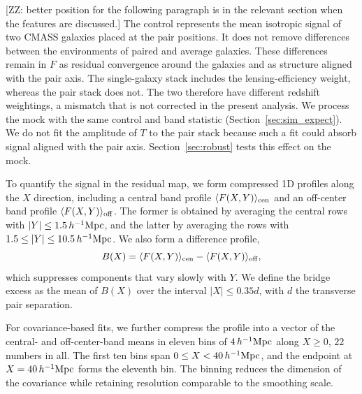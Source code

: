 \documentclass[preprint]{aastex701}
\newcommand{\hinvMpc}{h^{-1}{\rm Mpc}}
\newcommand{\ZZ}[1]{{\color{red} [ZZ: #1]}}
\begin{document}
 {
\ZZ{better position for the following paragraph is in the relevant section when the features are discussed.}
The control represents the mean isotropic signal of two CMASS galaxies placed
at the pair positions. It does not remove differences between the
environments of paired and average galaxies. These differences remain in
$F$ as residual convergence around the galaxies and as structure aligned
with the pair axis. The single-galaxy stack includes the lensing-efficiency
weight, whereas the pair stack does not. The two therefore have different
redshift weightings, a mismatch that is not corrected in the present
analysis. We process the mock with the same control and band statistic
(Section~\ref{sec:sim_expect}). We do not fit the amplitude of $T$ to the
pair stack because such a fit could absorb signal aligned with the pair axis.
Section~\ref{sec:robust} tests this effect on the mock.
}\fi


To quantify the signal in the residual map, we form compressed 1D profiles along the $X$ direction, including a central band profile $\langle F(X,Y)\rangle_{\rm cen}$ and an off-center band profile $\langle F(X,Y)\rangle_{\rm off}$. The former is obtained by averaging the central rows with $|Y|\leq1.5\,\hinvMpc$, and the latter by averaging the rows with $1.5\leq|Y|\leq10.5\,\hinvMpc$. We also form a difference profile, 
\begin{equation}
    B(X)=\langle F(X,Y)\rangle_{\rm cen} - \langle F(X,Y)\rangle_{\rm off},
    \label{eq:band}
\end{equation}
which suppresses components that vary slowly with $Y$. We define the bridge excess as the mean of $B(X)$ over the interval $|X|\leq 0.35 d$, with $d$ the transverse pair separation. 

For covariance-based fits, we further compress the profile into a vector of the
central- and off-center-band means in eleven bins of
$4\,\hinvMpc$ along $X\geq0$, $22$ numbers in all. The first ten bins span
$0\leq X<40\,\hinvMpc$, and the endpoint at $X=40\,\hinvMpc$ forms the
eleventh bin. The binning reduces the dimension of the covariance while
retaining resolution comparable to the smoothing scale.
\end{document}
